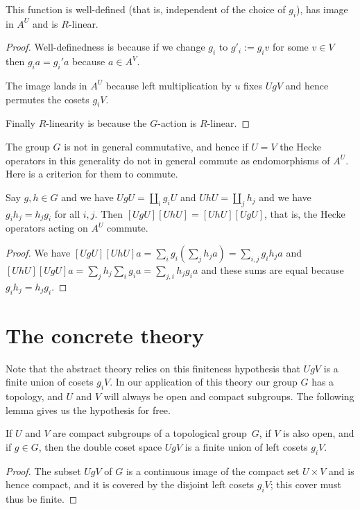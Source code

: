 \begin{lemma}
  \label{AbstractHeckeOperator.HeckeOperator}
  \leanok
  This function is well-defined (that is, independent of the
  choice of $g_i$), has image in $A^U$ and is $R$-linear.
\end{lemma}
\begin{proof}
  \leanok
  Well-definedness is because if we change $g_i$ to $g'_i:=g_iv$
  for some $v\in V$ then $g_ia=g_i'a$ because $a\in A^V$.

  The image lands in $A^U$ because left multiplication by $u$
  fixes $UgV$ and hence permutes the cosets $g_iV$.

  Finally $R$-linearity is because the $G$-action is $R$-linear.
\end{proof}

The group $G$ is not in general commutative, and hence if $U=V$
the Hecke operators in this generality do not in general commute
as endomorphisms of $A^U$. Here is a criterion for
them to commute.

\begin{lemma}
  \label{AbstractHeckeOperator.comm}
  \leanok
  Say $g,h\in G$ and we have $UgU=\coprod_i g_iU$
  and $UhU=\coprod_j h_j$ and we have $g_ih_j=h_jg_i$ for all $i,j$.
  Then $[UgU][UhU]=[UhU][UgU]$, that is, the Hecke operators
  acting on $A^U$ commute.
\end{lemma}
\begin{proof}
  \leanok
  We have $[UgU][UhU]a=\sum_ig_i(\sum_jh_ja)=\sum_{i,j}g_ih_ja$
  and $[UhU][UgU]a=\sum_jh_j\sum_ig_ia=\sum_{j,i}h_jg_ia$ and these
  sums are equal because $g_ih_j=h_jg_i$.
\end{proof}

\section{The concrete theory}

Note that the abstract theory relies on this finiteness hypothesis that $UgV$
is a finite union of cosets $g_iV$. In our application of this theory our group
$G$ has a topology, and $U$ and $V$ will always be open and compact subgroups.
The following lemma gives us the hypothesis for free.

\begin{lemma}
  \label{QuotientGroup.mk_image_finite_of_compact_of_open}
  \leanok
  If $U$ and $V$ are compact subgroups of a topological group~$G$,
  if $V$ is also open, and if $g\in G$, then the double coset space $UgV$
  is a finite union of left cosets $g_iV$.
\end{lemma}
\begin{proof}
  The subset $UgV$ of $G$ is a continuous image of the compact set $U\times V$
  and is hence compact, and it is covered by the disjoint left cosets $g_iV$;
  this cover must thus be finite.
\end{proof}

